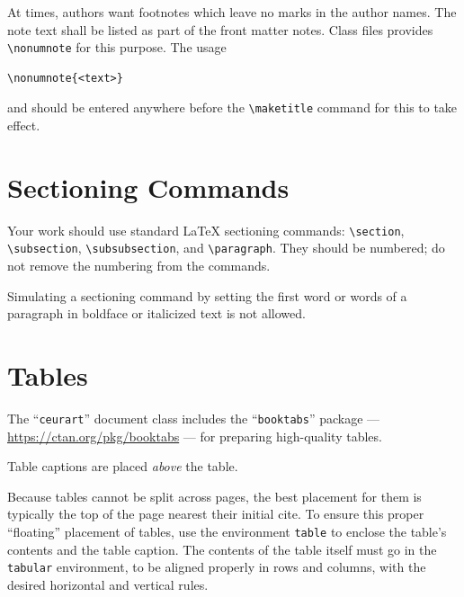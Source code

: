 \documentclass[
]{ceurart}
\begin{document}
At times, authors want footnotes which leave no marks in
the author names. The note text shall be listed as part of
the front matter notes. Class files provides
\verb|\nonumnote| for this purpose. The usage
\begin{lstlisting}
\nonumnote{<text>}
\end{lstlisting}
and should be entered anywhere before the \verb|\maketitle|
command for this to take effect. 

\section{Sectioning Commands}

Your work should use standard \LaTeX{} sectioning commands:
\verb|\section|, \verb|\subsection|,
\verb|\subsubsection|, and
\verb|\paragraph|. They should be numbered; do not remove
the numbering from the commands.

Simulating a sectioning command by setting the first word or words of
a paragraph in boldface or italicized text is not allowed.

\section{Tables}

The ``\verb|ceurart|'' document class includes the ``\verb|booktabs|''
package --- \url{https://ctan.org/pkg/booktabs} --- for preparing
high-quality tables.

Table captions are placed \textit{above} the table.

Because tables cannot be split across pages, the best placement for
them is typically the top of the page nearest their initial cite.  To
ensure this proper ``floating'' placement of tables, use the
environment \verb|table| to enclose the table's contents and the
table caption. The contents of the table itself must go in the
\verb|tabular| environment, to be aligned properly in rows and
columns, with the desired horizontal and vertical rules.
\end{document}
